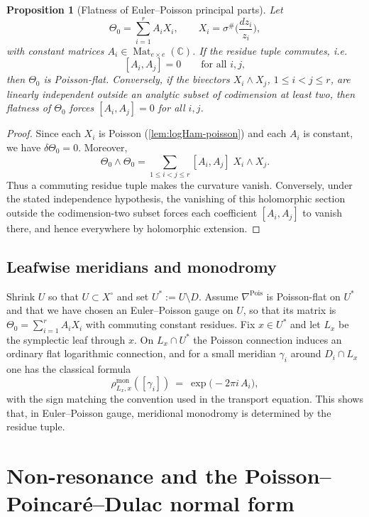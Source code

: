 \documentclass[11pt]{amsart}
\theoremstyle{plain}
\newtheorem{proposition}[theorem]{Proposition}
\theoremstyle{definition}
\DeclareMathOperator{\Mat}{Mat}
\newcommand{\mon}{\mathrm{mon}}
\theoremstyle{definition}
\newcommand{\C}{\mathbb{C}}
\begin{document}
\begin{proposition}[Flatness of Euler--Poisson principal parts]\label{prop:EP-flat}
Let
$$
\Theta_0=\sum_{i=1}^r A_iX_i,
\qquad
X_i=\sigma^\# \Big(\frac{dz_i}{z_i}\Big),
$$
with constant matrices $A_i\in\Mat_{e\times e}(\C)$. If the residue tuple commutes, i.e.
$$
[A_i,A_j]=0\qquad\text{for all }i,j,
$$
then $\Theta_0$ is Poisson-flat. Conversely, if the bivectors $X_i\wedge X_j$, $1\le i<j\le r$, are linearly independent outside an analytic subset of codimension at least two, then flatness of $\Theta_0$ forces $[A_i,A_j]=0$ for all $i,j$.
\end{proposition}

\begin{proof}
Since each $X_i$ is Poisson (\ref{lem:logHam-poisson}) and each $A_i$ is constant,
we have $\delta\Theta_0=0$. Moreover,
$$
\Theta_0\wedge\Theta_0
=
\sum_{1\le i<j\le r} [A_i,A_j]\; X_i\wedge X_j.
$$
Thus a commuting residue tuple makes the curvature vanish. Conversely, under the stated independence hypothesis, the vanishing of this holomorphic section outside the codimension-two subset forces each coefficient $[A_i,A_j]$ to vanish there, and hence everywhere by holomorphic extension.
\end{proof}

 

\subsection{Leafwise meridians and monodromy  }

Shrink $U$ so that $U\subset X^\circ$ and set $U^*:=U\setminus D$.
Assume $\nabla^{\mathrm{Pois}}$ is Poisson-flat on $U^*$ and that we have chosen an Euler--Poisson gauge on $U$,
so that its matrix is $\Theta_0=\sum_{i=1}^r A_i X_i$ with commuting constant residues.
Fix $x\in U^*$ and let $L_x$ be the symplectic leaf through $x$.
On $L_x\cap U^*$ the Poisson connection induces an ordinary flat logarithmic connection, and for a small meridian
$\gamma_i$ around $D_i\cap L_x$ one has the classical formula
$$
\rho^{\mon}_{L_x,x}([\gamma_i])\ =\ \exp\big(-2\pi i\,A_i\big),
$$
with the sign matching the convention used in the transport equation.
This shows that, in Euler--Poisson gauge, meridional monodromy is determined by the residue tuple.



\section{Non-resonance and the Poisson--Poincar\'e--Dulac normal form}\label{sec:PPD}
\end{document}
